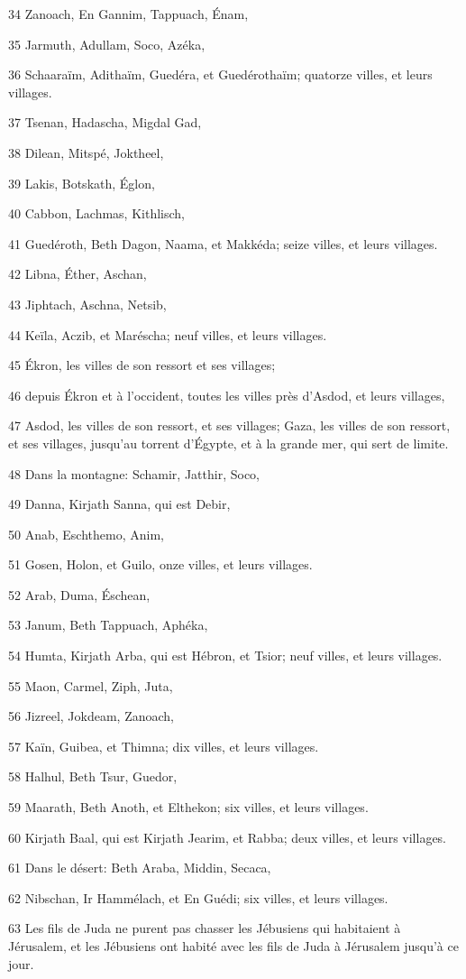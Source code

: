 \par 34 Zanoach, En Gannim, Tappuach, Énam,
\par 35 Jarmuth, Adullam, Soco, Azéka,
\par 36 Schaaraïm, Adithaïm, Guedéra, et Guedérothaïm; quatorze villes, et leurs villages.
\par 37 Tsenan, Hadascha, Migdal Gad,
\par 38 Dilean, Mitspé, Joktheel,
\par 39 Lakis, Botskath, Églon,
\par 40 Cabbon, Lachmas, Kithlisch,
\par 41 Guedéroth, Beth Dagon, Naama, et Makkéda; seize villes, et leurs villages.
\par 42 Libna, Éther, Aschan,
\par 43 Jiphtach, Aschna, Netsib,
\par 44 Keïla, Aczib, et Maréscha; neuf villes, et leurs villages.
\par 45 Ékron, les villes de son ressort et ses villages;
\par 46 depuis Ékron et à l'occident, toutes les villes près d'Asdod, et leurs villages,
\par 47 Asdod, les villes de son ressort, et ses villages; Gaza, les villes de son ressort, et ses villages, jusqu'au torrent d'Égypte, et à la grande mer, qui sert de limite.
\par 48 Dans la montagne: Schamir, Jatthir, Soco,
\par 49 Danna, Kirjath Sanna, qui est Debir,
\par 50 Anab, Eschthemo, Anim,
\par 51 Gosen, Holon, et Guilo, onze villes, et leurs villages.
\par 52 Arab, Duma, Éschean,
\par 53 Janum, Beth Tappuach, Aphéka,
\par 54 Humta, Kirjath Arba, qui est Hébron, et Tsior; neuf villes, et leurs villages.
\par 55 Maon, Carmel, Ziph, Juta,
\par 56 Jizreel, Jokdeam, Zanoach,
\par 57 Kaïn, Guibea, et Thimna; dix villes, et leurs villages.
\par 58 Halhul, Beth Tsur, Guedor,
\par 59 Maarath, Beth Anoth, et Elthekon; six villes, et leurs villages.
\par 60 Kirjath Baal, qui est Kirjath Jearim, et Rabba; deux villes, et leurs villages.
\par 61 Dans le désert: Beth Araba, Middin, Secaca,
\par 62 Nibschan, Ir Hammélach, et En Guédi; six villes, et leurs villages.
\par 63 Les fils de Juda ne purent pas chasser les Jébusiens qui habitaient à Jérusalem, et les Jébusiens ont habité avec les fils de Juda à Jérusalem jusqu'à ce jour.

